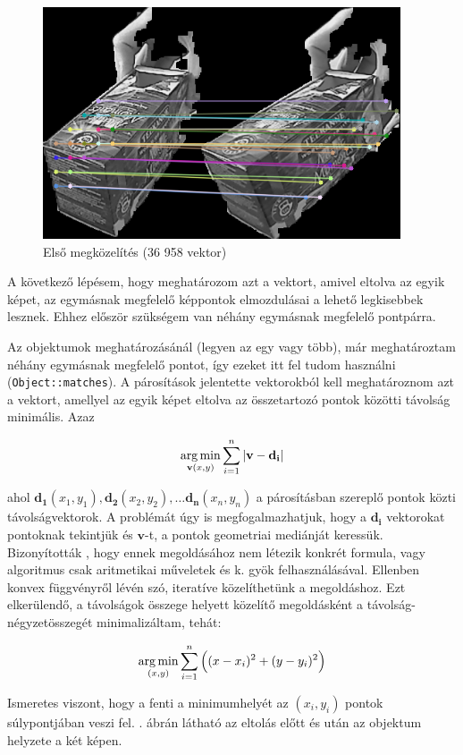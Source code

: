 \begin{figure}[tbh]
\centering
\includegraphics[width=300pt]{figures/vis_bad_0.png}
\caption{Első megközelítés (36 958 vektor) \label{fig:bad0}}
\end{figure}

A következő lépésem, hogy meghatározom azt a vektort, amivel eltolva az egyik képet, az egymásnak megfelelő képpontok elmozdulásai a lehető legkisebbek lesznek. Ehhez először szükségem van néhány egymásnak megfelelő pontpárra.

Az objektumok meghatározásánál (legyen az egy vagy több), már meghatároztam néhány egymásnak megfelelő pontot, így ezeket itt fel tudom használni (\texttt{Object::matches}). A párosítások jelentette vektorokból kell meghatároznom azt a vektort, amellyel az egyik képet eltolva az összetartozó pontok közötti távolság minimális. Azaz

\[\operatorname*{arg\,min}_{\mathbf{v}(x, y)} \sum_{i=1}^{n} |\mathbf{v} - \mathbf{d_i}|\]

ahol $\mathbf{d_1}(x_1, y_1), \mathbf{d_2}(x_2, y_2), \ldots \mathbf{d_n}(x_n, y_n)$ a párosításban szereplő pontok közti távolságvektorok. A problémát úgy is megfogalmazhatjuk, hogy a $\mathbf{d_i}$ vektorokat pontoknak tekintjük és $\mathbf{v}$-t, a pontok geometriai mediánját keressük. Bizonyították \cite{Bajaj198699}, hogy ennek megoldásához nem létezik konkrét formula, vagy algoritmus csak aritmetikai műveletek és k. gyök felhasználásával. Ellenben konvex függvényről lévén szó, iteratíve közelíthetünk a megoldáshoz. Ezt elkerülendő, a távolságok összege helyett közelítő megoldásként a távolság-négyzetösszegét minimalizáltam, tehát:

\[\operatorname*{arg\,min}_{(x, y)} \sum_{i=1}^{n} \Big((x-x_i)^2 + (y-y_i)^2\Big)\]

Ismeretes viszont, hogy a fenti a minimumhelyét az $(x_i, y_i)$ pontok súlypontjában veszi fel. . ábrán látható az eltolás előtt és után az objektum helyzete a két képen.

